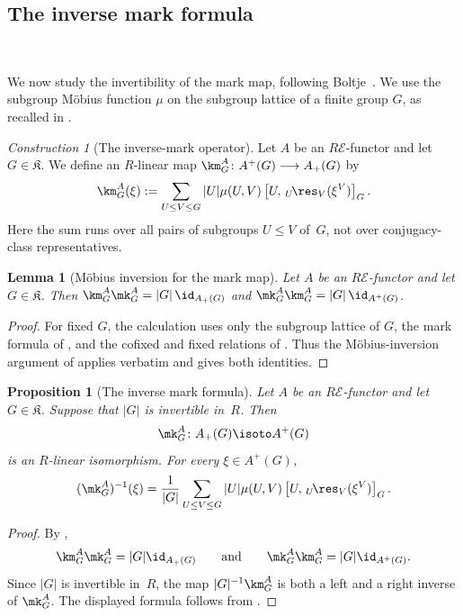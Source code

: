 \documentclass{amsart}
\numberwithin{equation}{section}%
\newtheorem{Prop}[equation]{Proposition}
\newtheorem{Lem}[equation]{Lemma}
\theoremstyle{remark}
\newtheorem{Cons}[equation]{Construction}
\theoremstyle{definition}
\newcommand{\e}{\mathcal E}
\newcommand{\lres}[1]{{}_{#1}\!\res}
\begin{document}
%
\subsection{The inverse mark formula}\
\label{ssec:inverse-mark-formula}
%

We now study the invertibility of the mark map, following
Boltje~\cite[Proposition~2.4]{Boltje98a}.
We use the subgroup Möbius function $\mu$ on the subgroup
lattice of a finite group $G$, as recalled in
.
%
\begin{Cons}[The inverse-mark operator]
\label{con:inverse-mark-operator}
Let $A$ be an $R\e$-functor and let $G\in\mathfrak K$.
We define an $R$-linear map
$\km_G^A\colon A^+(G)\longrightarrow A_+(G)$
by
%
\[
\km_G^A(\xi)
:=
\sum_{U\leq V\leq G}
|U|\mu(U,V)
\left[
U,\,
\lres{U}_V(\xi^V)
\right]_G.
\]
%
Here the sum runs over all pairs of subgroups $U\leq V$ of~$G$,
not over conjugacy-class representatives.
\end{Cons}
%
\begin{Lem}[Möbius inversion for the mark map]
\label{lem:mark-Mobius-inversion}
Let $A$ be an $R\e$-functor and let $G\in\mathfrak K$.
Then
$\km_G^A\mk_G^A=|G|\,\id_{A_+(G)}$
and
$\mk_G^A\km_G^A=
|G|\,\id_{A^+(G)}$.
\end{Lem}
%
\begin{proof}
For fixed $G$, the calculation uses only the subgroup lattice of
$G$, the mark formula of \Cref{prop:mark-formula}, and the cofixed
and fixed relations of
.
Thus the Möbius-inversion argument of
\cite[Proposition~2.4]{Boltje98a} applies verbatim and gives both
identities.
\end{proof}
%
\begin{Prop}[The inverse mark formula]
\label{prop:inverse-mark-formula}
Let $A$ be an $R\e$-functor and let $G\in\mathfrak K$.
Suppose that $|G|$ is invertible in~$R$.
Then
%
\[
\mk_G^A\colon A_+(G)\isoto A^+(G)
\]
%
is an $R$-linear isomorphism.
For every $\xi\in A^+(G)$,
%
\begin{equation}
\label{eq:mark-inverse}
(\mk_G^A)^{-1}(\xi)
=
\frac{1}{|G|}
\sum_{U\leq V\leq G}
|U|\mu(U,V)
\left[
U,\,
{}\lres{U}_V(\xi^V)
\right]_G.
\end{equation}
%
\end{Prop}
%
\begin{proof}
By ,
%
\[
\km_G^A\mk_G^A
=
|G|\id_{A_+(G)}
\qquad\text{and}\qquad
\mk_G^A\km_G^A
=
|G|\id_{A^+(G)}.
\]
%
Since $|G|$ is invertible in~$R$, the map
$|G|^{-1}\km_G^A$ is both a left and a right inverse of
$\mk_G^A$.
The displayed formula follows from
.
\end{proof}
\end{document}
